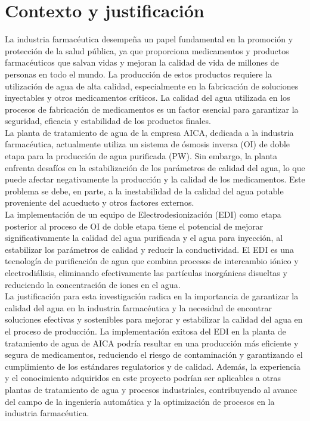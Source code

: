 \section*{Contexto y justificación}
La industria farmacéutica desempeña un papel fundamental en la promoción y protección de la salud pública, ya que proporciona medicamentos y productos farmacéuticos que salvan vidas y mejoran la calidad de vida de millones de personas en todo el mundo. La producción de estos productos requiere la utilización de agua de alta calidad, especialmente en la fabricación de soluciones inyectables y otros medicamentos críticos. La calidad del agua utilizada en los procesos de fabricación de medicamentos es un factor esencial para garantizar la seguridad, eficacia y estabilidad de los productos finales.\\

La planta de tratamiento de agua de la empresa AICA, dedicada a la industria farmacéutica, actualmente utiliza un sistema de ósmosis inversa (OI) de doble etapa para la producción de agua purificada (PW). Sin embargo, la planta enfrenta desafíos en la estabilización de los parámetros de calidad del agua, lo que puede afectar negativamente la producción y la calidad de los medicamentos. Este problema se debe, en parte, a la inestabilidad de la calidad del agua potable proveniente del acueducto y otros factores externos.\\

La implementación de un equipo de Electrodesionización (EDI) como etapa posterior al proceso de OI de doble etapa tiene el potencial de mejorar significativamente la calidad del agua purificada y el agua para inyección, al estabilizar los parámetros de calidad y reducir la conductividad. El EDI es una tecnología de purificación de agua que combina procesos de intercambio iónico y electrodiálisis, eliminando efectivamente las partículas inorgánicas disueltas y reduciendo la concentración de iones en el agua.\\

La justificación para esta investigación radica en la importancia de garantizar la calidad del agua en la industria farmacéutica y la necesidad de encontrar soluciones efectivas y sostenibles para mejorar y estabilizar la calidad del agua en el proceso de producción. La implementación exitosa del EDI en la planta de tratamiento de agua de AICA podría resultar en una producción más eficiente y segura de medicamentos, reduciendo el riesgo de contaminación y garantizando el cumplimiento de los estándares regulatorios y de calidad. Además, la experiencia y el conocimiento adquiridos en este proyecto podrían ser aplicables a otras plantas de tratamiento de agua y procesos industriales, contribuyendo al avance del campo de la ingeniería automática y la optimización de procesos en la industria farmacéutica.\\
